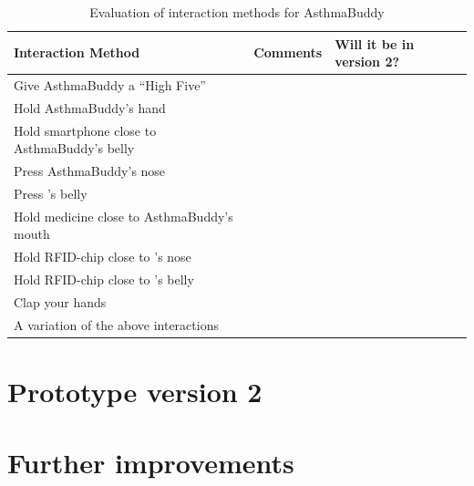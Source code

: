 \begin{table}[H]
\begin{tabular}{|p{5.0cm} | p{6.0cm} | p{3.0cm} |}
\hline 
\textbf{Interaction Method} & \textbf{Comments} & \textbf{Will it be in version 2?}\\
\hline
	Give AsthmaBuddy a ``High Five'' & & \\
\hline
	Hold AsthmaBuddy's hand & & \\
\hline
	Hold smartphone close to AsthmaBuddy's belly & & \\
\hline
	Press AsthmaBuddy's nose & & \\
\hline
	Press \buddy{}'s belly & & \\
\hline
	Hold medicine close to AsthmaBuddy's mouth & & \\
\hline
	Hold RFID-chip close to \buddy{}'s nose & & \\
\hline
	Hold RFID-chip close to \buddy{}'s belly & & \\
\hline
	Clap your hands & & \\
\hline
	A variation of the above interactions & & \\
\hline
\end{tabular}
\caption{Evaluation of interaction methods for AsthmaBuddy}
\label{tab:interactioneval}
\end{table}


\section{Prototype version 2}


\section{Further improvements}

 

